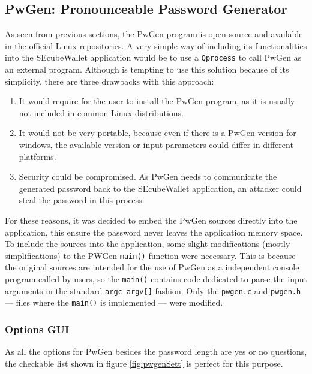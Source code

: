 \subsection{PwGen: Pronounceable Password Generator}
As seen from previous sections, the PwGen program is open source and available in the official Linux repositories. A very simple way of including its functionalities into the SEcubeWallet application would be to use a \texttt{Qprocess} to call PwGen as an external program. Although is tempting to use this solution because of its simplicity, there are three drawbacks with this approach:

\begin{enumerate}
\item It would require for the user to install the PwGen program, as it is usually not included in common Linux distributions.
\item It would not be very portable, because even if there is a PwGen version for windows, the available version or input parameters could differ in different platforms.
\item Security could be compromised. As PwGen needs to communicate the generated password back to the SEcubeWallet application, an attacker could steal the password in this process.
\end{enumerate}

For these reasons, it was decided to embed the PwGen sources directly into the application, this ensure the password never leaves the application memory space. 
To include the sources into the application, some slight modifications (mostly simplifications) to the PWGen \texttt{main()} function were necessary. This is because the original sources are intended for the use of PwGen as a independent console program called by users, so the \texttt{main()} contains code dedicated to parse the input arguments in the standard \texttt{argc argv[]} fashion. Only the \texttt{pwgen.c} and \texttt{pwgen.h} --- files where the \texttt{main()} is implemented --- were modified.

\subsubsection*{Options GUI}
As all the options for PwGen besides the password length are yes or no questions, the checkable list shown in figure \ref{fig:pwgenSett} is perfect for this purpose.

